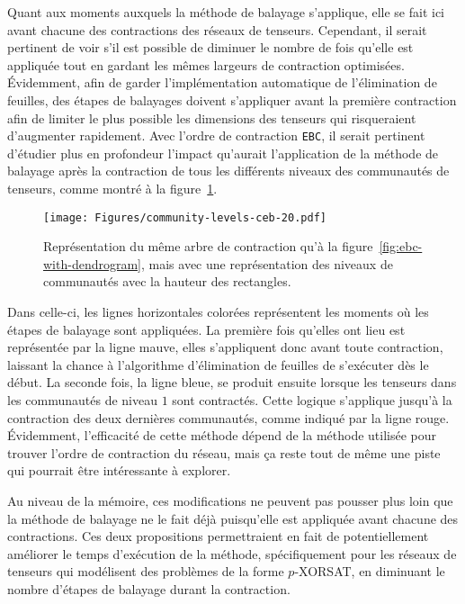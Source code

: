 Quant aux moments auxquels la méthode de balayage s'applique, elle se fait ici avant chacune des contractions des réseaux de tenseurs.
Cependant, il serait pertinent de voir s'il est possible de diminuer le nombre de fois qu'elle est appliquée tout en gardant les mêmes largeurs de contraction optimisées.
Évidemment, afin de garder l'implémentation automatique de l'élimination de feuilles, des étapes de balayages doivent s'appliquer avant la première contraction afin de limiter le plus possible les dimensions des tenseurs qui risqueraient d'augmenter rapidement.
Avec l'ordre de contraction \verb|EBC|, il serait pertinent d'étudier plus en profondeur l'impact qu'aurait l'application de la méthode de balayage après la contraction de tous les différents niveaux des communautés de tenseurs, comme montré à la figure~\ref{fig:less-sweeping-steps-ceb}.
\begin{figure}[h]
    \centering
    \texttt{[image: Figures/community-levels-ceb-20.pdf]}
    \caption[Représentation du même arbre de contraction qu'à la figure~\ref{fig:ebc-with-dendrogram}, mais avec une représentation des niveaux de communautés.]{Représentation du même arbre de contraction qu'à la figure~\ref{fig:ebc-with-dendrogram}, mais avec une représentation des niveaux de communautés avec la hauteur des rectangles.}
    \label{fig:less-sweeping-steps-ceb}
\end{figure}
Dans celle-ci, les lignes horizontales colorées représentent les moments où les étapes de balayage sont appliquées.
La première fois qu'elles ont lieu est représentée par la ligne mauve, elles s'appliquent donc avant toute contraction, laissant la chance à l'algorithme d'élimination de feuilles de s'exécuter dès le début.
La seconde fois, la ligne bleue, se produit ensuite lorsque les tenseurs dans les communautés de niveau $1$ sont contractés.
Cette logique s'applique jusqu'à la contraction des deux dernières communautés, comme indiqué par la ligne rouge.
Évidemment, l'efficacité de cette méthode dépend de la méthode utilisée pour trouver l'ordre de contraction du réseau, mais ça reste tout de même une piste qui pourrait être intéressante à explorer.

Au niveau de la mémoire, ces modifications ne peuvent pas pousser plus loin que la méthode de balayage ne le fait déjà puisqu'elle est appliquée avant chacune des contractions.
Ces deux propositions permettraient en fait de potentiellement améliorer le temps d'exécution de la méthode, spécifiquement pour les réseaux de tenseurs qui modélisent des problèmes de la forme $p$-XORSAT, en diminuant le nombre d'étapes de balayage durant la contraction.
